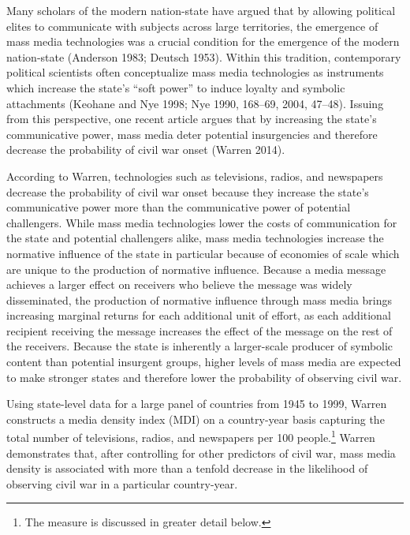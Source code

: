 \documentclass[12pt,article,oneside]{memoir}
\begin{document}
Many scholars of the modern nation-state have argued that by allowing
political elites to communicate with subjects across large territories,
the emergence of mass media technologies was a crucial condition for the
emergence of the modern nation-state (Anderson 1983; Deutsch 1953).
Within this tradition, contemporary political scientists often
conceptualize mass media technologies as instruments which increase the
state's ``soft power'' to induce loyalty and symbolic attachments
(Keohane and Nye 1998; Nye 1990, 168--69, 2004, 47--48). Issuing from
this perspective, one recent article argues that by increasing the
state's communicative power, mass media deter potential insurgencies and
therefore decrease the probability of civil war onset (Warren 2014).

According to Warren, technologies such as televisions, radios, and
newspapers decrease the probability of civil war onset because they
increase the state's communicative power more than the communicative
power of potential challengers. While mass media technologies lower the
costs of communication for the state and potential challengers alike,
mass media technologies increase the normative influence of the state in
particular because of economies of scale which are unique to the
production of normative influence. Because a media message achieves a
larger effect on receivers who believe the message was widely
disseminated, the production of normative influence through mass media
brings increasing marginal returns for each additional unit of effort,
as each additional recipient receiving the message increases the effect
of the message on the rest of the receivers. Because the state is
inherently a larger-scale producer of symbolic content than potential
insurgent groups, higher levels of mass media are expected to make
stronger states and therefore lower the probability of observing civil
war.

Using state-level data for a large panel of countries from 1945 to 1999,
Warren constructs a media density index (MDI) on a country-year basis
capturing the total number of televisions, radios, and newspapers per
100 people.\footnote{The measure is discussed in greater detail below.}
Warren demonstrates that, after controlling for other predictors of
civil war, mass media density is associated with more than a tenfold
decrease in the likelihood of observing civil war in a particular
country-year.
\end{document}
